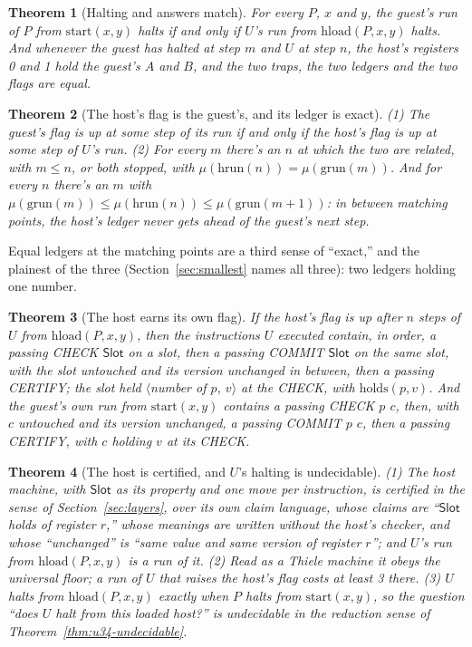 \documentclass[11pt,twoside]{article}
\theoremstyle{thielethm}
\newtheorem{theorem}{Theorem}[section]
\theoremstyle{thieledef}
\theoremstyle{thieledef}
\theoremstyle{thieledef}
\theoremstyle{thielethm}
\theoremstyle{thieleobs}
\theoremstyle{thielethm}
\begin{document}
\begin{theorem}[Halting and answers match]\label{thm:u34-U-halting}
For every $P$, $x$ and $y$, the guest's run of $P$ from $\mathrm{start}(x, y)$ halts if and only
if $U$'s run from $\mathrm{hload}(P, x, y)$ halts. And whenever the guest has halted at step $m$
and $U$ at step $n$, the host's registers 0 and 1 hold the guest's $A$ and $B$, and the two traps,
the two ledgers and the two flags are equal.
\end{theorem}

\begin{theorem}[The host's flag is the guest's, and its ledger is exact]\label{thm:u34-U-flag}
(1) The guest's flag is up at some step of its run if and only if the host's flag is up at some
step of $U$'s run. (2) For every $m$ there's an $n$ at which the two are related, with $m \le n$, or both stopped,
with $\mu(\mathrm{hrun}(n)) = \mu(\mathrm{grun}(m))$. And for every $n$ there's an $m$ with
$\mu(\mathrm{grun}(m)) \le \mu(\mathrm{hrun}(n)) \le \mu(\mathrm{grun}(m + 1))$: in between
matching points, the host's ledger never gets ahead of the guest's next step.
\end{theorem}

Equal ledgers at the matching points are a third sense of ``exact,'' and the plainest of the three (Section~\ref{sec:smallest} names all three): two ledgers holding one number.

\begin{theorem}[The host earns its own flag]\label{thm:u34-U-earned}
If the host's flag is up after $n$ steps of $U$ from $\mathrm{hload}(P, x, y)$, then the
instructions $U$ executed contain, in order, a passing CHECK $\mathsf{Slot}$ on a slot, then a
passing COMMIT $\mathsf{Slot}$ on the same slot, with the slot untouched and its version unchanged
in between, then a passing CERTIFY; the slot held
$\langle$number of $p$, $v\rangle$ at the CHECK, with $\mathrm{holds}(p, v)$. And the guest's own
run from $\mathrm{start}(x, y)$ contains a passing CHECK $p$ $c$, then, with $c$ untouched and
its version unchanged, a passing COMMIT $p$ $c$, then a passing CERTIFY, with $c$ holding $v$ at
its CHECK.
\end{theorem}

\begin{theorem}[The host is certified, and $U$'s halting is undecidable]\label{thm:u34-U-complete}
(1) The host machine, with $\mathsf{Slot}$ as its property and one move per instruction, is
certified in the sense of Section~\ref{sec:layers}, over its own
claim language, whose claims are ``$\mathsf{Slot}$ holds of register $r$,'' whose meanings are
written without the host's checker, and whose ``unchanged'' is ``same value and same version of
register $r$''; and $U$'s run from $\mathrm{hload}(P, x, y)$ is a run of it. (2) Read as a Thiele machine it obeys the universal
floor; a run of $U$ that raises the host's flag costs at least 3 there.
(3) $U$ halts from $\mathrm{hload}(P, x, y)$ exactly when $P$ halts from $\mathrm{start}(x, y)$, so
the question ``does $U$ halt from this loaded host?'' is undecidable in the reduction sense of
Theorem~\ref{thm:u34-undecidable}.
\end{theorem}
\end{document}
